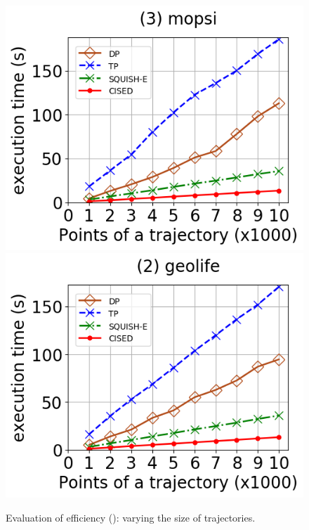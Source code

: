 \begin{figure}[tb!]
	\includegraphics[scale=0.315]{Figures/Exp-SED-time-size-mopsi.png}	\hspace{1ex}
	\includegraphics[scale=0.315]{Figures/Exp-SED-time-size-geolife.png}	\hspace{1ex}
	\vspace{-2.5ex}
	\caption{\small Evaluation of efficiency (\sed): varying the size of trajectories.}\label{fig:time-size-sed}
	\vspace{-3ex}
\end{figure}



